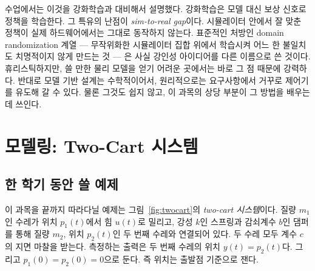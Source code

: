 \documentclass[11pt]{article}
\begin{document}
수업에서는 이것을 강화학습과 대비해서 설명했다. 강화학습은 모델 대신 보상
신호로 정책을 학습한다. 그 특유의 난점이 \emph{sim-to-real gap}이다. 시뮬레이터
안에서 잘 맞춘 정책이 실제 하드웨어에서는 그대로 동작하지 않는다. 표준적인
처방인 domain randomization 계열 --- 무작위화한 시뮬레이터 집합 위에서 학습시켜
어느 한 불일치도 치명적이지 않게 만드는 것 --- 은 사실 강인성 아이디어를 다른
이름으로 쓴 것이다. 휴리스틱하지만, 쓸 만한 물리 모델을 얻기 어려운 곳에서는
바로 그 점 때문에 강력하다. 반대로 모델 기반 설계는 수학적이어서, 원리적으로는
요구사항에서 거꾸로 제어기를 유도해 갈 수 있다. 물론 그것도 쉽지 않고, 이 과목의
상당 부분이 그 방법을 배우는 데 쓰인다.


\section{모델링: Two-Cart 시스템}

\subsection{한 학기 동안 쓸 예제}
이 과목을 끝까지 따라다닐 예제는 그림~\ref{fig:twocart}의 \emph{two-cart
시스템}이다. 질량 $m_1$인 수레가 위치 $p_1(t)$에서 힘 $u(t)$로 밀리고, 강성
$k$인 스프링과 감쇠계수 $b$인 댐퍼를 통해 질량 $m_2$, 위치 $p_2(t)$인 두 번째
수레와 연결되어 있다. 두 수레 모두 계수 $c$의 지면 마찰을 받는다. 측정하는
출력은 두 번째 수레의 위치 $y(t) = p_2(t)$다. 그리고 $p_1(0)=p_2(0)=0$으로 둔다.
즉 위치는 출발점 기준으로 잰다.
\end{document}
